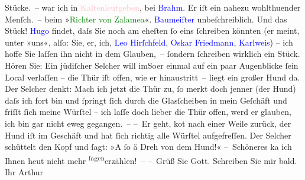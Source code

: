                Stücke. – \label{K_L00921_7v}\label{K_L00921_7h} war ich {\pb}in \textcolor{pink}{Kaltenleutgeben}{}\ledrightnote{\textcolor{pink}{Kaltenleutgeben}}, bei \textcolor{blue}{Brahm}{}\ledrightnote{\textcolor{blue}{Otto Brahm}}. Er iſt ein
               nahezu wohlthuender Menſch. –\pend
           \pstart
           \label{K_L00921_8v}\label{K_L00921_8h} beim »\textcolor{green}{Richter von Zalamea}{}\ledrightnote{\textcolor{green}{Der Richter von Zalamea}}«. \textcolor{blue}{Baumeiſter}{}\ledrightnote{\textcolor{blue}{Bernhard Baumeister}} unbeſchreiblich. Und das Stück! \textcolor{blue}{Hugo}{}\ledrightnote{\textcolor{blue}{Hugo von Hofmannsthal}} findet, daſs Sie noch am eheſten ſo eins ſchreiben könnten
               (er meint, unter »uns«, alſo: Sie, er, ich, \textcolor{blue}{Leo
                  Hirſchfeld}{}\ledrightnote{\textcolor{blue}{Leo Feld}}, \textcolor{blue}{Oskar Friedmann}{}\ledrightnote{\textcolor{blue}{Oskar Friedmann}}, \textcolor{blue}{Karlweis}{}\ledrightnote{\textcolor{blue}{Carl Karlweis}}) – ich hoffe {\pb}Sie laſſen ihn nicht in dem Glauben, – ſondern
               ſchreiben wirklich ein Stück.\pend
           \pstart
           Hören Sie: Ein jüdiſcher Selcher will \introOben{}im\introOben{}{ }So{\geminationm}er einmal auf ein
               paar Augenblicke ſein Local verlaſſen – die Thür iſt offen, wie er hinaustritt –
               liegt ein großer Hund da. Der Selcher denkt: Mach ich jetzt die Thür zu, ſo merkt
               doch jenner (der Hund) daſs {\pb}ich fort bin und ſpringt
               ſich durch die Glasſcheiben in mein Geſchäft und friſſt ſich meine Würſtel – ich
               laſſe doch lieber die Thür offen, werd er glauben, ich bin gar nicht eweg
               gegangen. –\pend
           \pstart
           – Er geht, ko{\geminationm}t nach einer Weile zurück, der Hund iſt im
               Geschäft und hat ſich richtig alle Würſtel aufgefreſſen. Der Selcher schüttelt {\pb}den Kopf und ſagt: »A ſo ä Dreh von dem Hund!«\pend
           \pstart
           – Schöneres ka{\geminationn} ich Ihnen heut nicht mehr \substVorne{}\textsuperscript{ſagen}\substDazwischen{}erzählen\substHinten{}! –\pend
           \pstart
           – Grüß Sie Gott. Schreiben Sie mir bald.\pend
           \pstart Ihr \spacefill\mbox{Arthur}\pend{}\endnumbering{}  
      